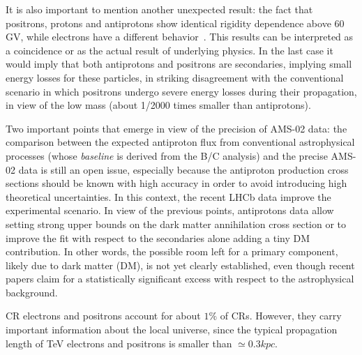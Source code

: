 \documentclass{PoS}
\begin{document}
It is also important to mention another unexpected result: the fact that positrons, protons and antiprotons show identical rigidity dependence above 60 GV, while electrons have a different behavior~\cite{antip}. This results can be interpreted as a  coincidence or as the actual result of underlying physics. In the last case it would imply that both antiprotons and positrons are secondaries, implying small energy losses for these particles, in striking disagreement with the conventional scenario in which positrons undergo severe energy losses during their propagation, in view of the low mass (about 1/2000 times smaller than antiprotons).

Two important points that emerge in view of the precision of AMS-02 data: the comparison between the expected antiproton flux from conventional astrophysical processes (whose \textit{baseline} is derived from the B/C analysis) and the precise AMS-02 data is still an open issue, especially because the antiproton production cross sections should be known with high accuracy in order to avoid introducing high theoretical uncertainties. 
In this context, the recent  LHCb data improve the experimental scenario. In view of the previous points, antiprotons data allow setting strong upper bounds on the dark matter annihilation cross section or to improve the fit with respect to the secondaries 
alone adding a tiny DM contribution. In other words, the possible room left for a primary component, likely due to dark matter (DM), is not yet clearly established, even though recent papers claim for a statistically significant excess with respect to the astrophysical background. 

CR electrons and positrons account for about $1\%$ of CRs. However, they carry important information about the
local universe, since the typical propagation length of TeV electrons and positrons is smaller than $\simeq 0.3 kpc$. 
\end{document}
